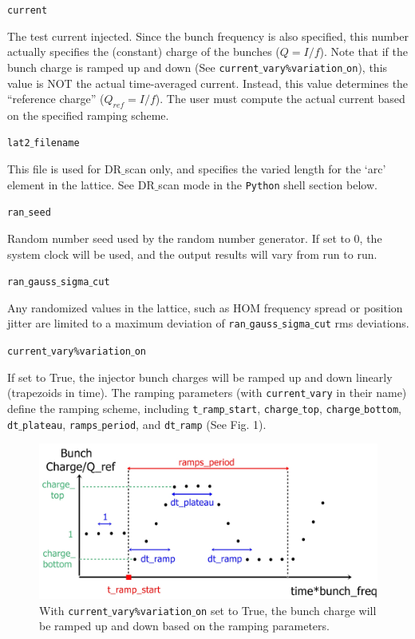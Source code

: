 \documentclass{article}
\begin{document}
\bigbreak
\hspace*{-2cm}
\texttt{current}

\noindent
The test current injected. Since the bunch frequency is also specified, this number actually specifies the (constant) charge of the bunches ($Q = I/f$). Note that if the bunch charge is ramped up and down (See \texttt{current$\_$vary\%variation$\_$on}), this value is NOT the actual time-averaged current. Instead, this value determines the ``reference charge'' ($Q_{ref} = I/f$). The user must compute the actual current based on the specified ramping scheme. 



\bigbreak
\hspace*{-2cm}
\texttt{lat2$\_$filename}

\noindent
This file is used for DR$\_$scan only, and specifies the varied length for the `arc' element in the lattice. See DR$\_$scan mode in the \texttt{Python} shell section below.

\bigbreak
\hspace*{-2cm}
\texttt{ran$\_$seed}

\noindent
Random number seed used by the random number generator. If set to 0, the system clock will be used, and the output results will vary from run to run.

\bigbreak
\hspace*{-2cm}
\texttt{ran$\_$gauss$\_$sigma$\_$cut}

\noindent
Any randomized values in the lattice, such as HOM frequency spread or position jitter are
limited to a maximum deviation of \texttt{ran$\_$gauss$\_$sigma$\_$cut} rms deviations.

\bigbreak
\hspace*{-2cm}
\texttt{current$\_$vary\%variation$\_$on}

\noindent
If set to True, the injector bunch charges will be ramped up and down linearly (trapezoids in time). The ramping parameters (with \texttt{current$\_$vary} in their name) define the ramping scheme, including \texttt{t$\_$ramp$\_$start}, \texttt{charge$\_$top}, \texttt{charge$\_$bottom}, \texttt{dt$\_$plateau}, \texttt{ramps$\_$period}, and \texttt{dt$\_$ramp} (See Fig. 1). 



\begin{figure}[h]
\includegraphics[scale=0.4]{BBU_code_description_ramping}
\caption{ With \texttt{current$\_$vary\%variation$\_$on} set to True, the bunch charge will be ramped up and down based on the ramping parameters.}
\label{setup1}
\end{figure}
\end{document}
